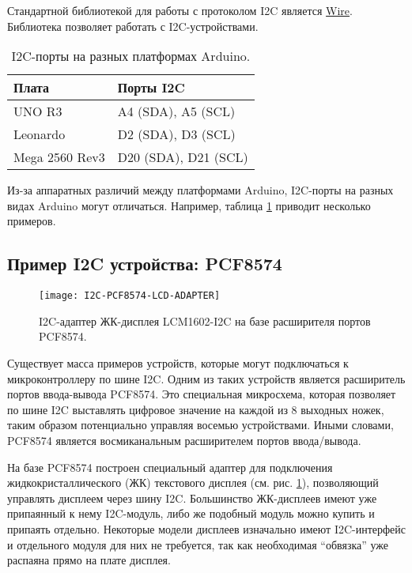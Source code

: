 \documentclass[../sparc.tex]{subfiles}
\begin{document}
Стандартной библиотекой для работы с протоколом I2C является
\href{https://www.arduino.cc/reference/en/language/functions/communication/wire/}{Wire}.
Библиотека позволяет работать с I2C-устройствами.

\begin{table}[h]
  \centering
  \begin{tabular}{ | m{5em} | m{2cm} | }
    \hline
    Плата & Порты I2C \\
    \hline
    UNO R3 & A4 (SDA), A5 (SCL) \\
    \hline
    Leonardo & D2 (SDA), D3 (SCL) \\
    \hline
    Mega 2560 Rev3 & D20 (SDA), D21 (SCL) \\
    \hline
  \end{tabular}
  \caption{I2C-порты на разных платформах Arduino.}
  \label{table:i2c-pins}
\end{table}

Из-за аппаратных различий между платформами Arduino, I2C-порты на разных видах
Arduino могут отличаться. Например, таблица \ref{table:i2c-pins} приводит
несколько примеров.

\subsection{Пример I2C устройства: PCF8574}

\begin{figure}[H]
  \centering
  \texttt{[image: I2C-PCF8574-LCD-ADAPTER]}
  \caption{I2C-адаптер ЖК-дисплея LCM1602-I2C на базе расширителя портов
    PCF8574.}
  \label{fig:i2c-pcf8574-lcd-adapter}
\end{figure}

Существует масса примеров устройств, которые могут подключаться к
микроконтроллеру по шине \gls{I2C}.  Одним из таких устройств является
расширитель портов ввода-вывода PCF8574.  Это специальная микросхема, которая
позволяет по шине I2C выставлять цифровое значение на каждой из 8 выходных
ножек, таким образом потенциально управляя восемью устройствами.  Иными словами,
PCF8574 является восмиканальным расширителем портов ввода/вывода.

На базе PCF8574 построен специальный адаптер для подключения
жидкокристаллического (ЖК) текстового дисплея
(см. рис. \ref{fig:i2c-pcf8574-lcd-adapter}), позволяющий управлять дисплеем
через шину I2C.  Большинство ЖК-дисплеев имеют уже припаянный к нему I2C-модуль,
либо же подобный модуль можно купить и припаять отдельно.  Некоторые модели
дисплеев изначально имеют I2C-интерфейс и отдельного модуля для них не
требуется, так как необходимая ``обвязка'' уже распаяна прямо на плате дисплея.
\end{document}

